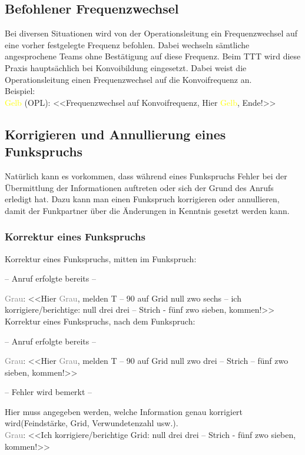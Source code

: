 \subsection{Befohlener Frequenzwechsel}
Bei diversen Situationen wird von der Operationsleitung ein Frequenzwechsel auf eine vorher festgelegte Frequenz befohlen. Dabei wechseln sämtliche angesprochene Teams ohne Bestätigung auf diese Frequenz. Beim TTT wird diese Praxis hauptsächlich bei Konvoibildung eingesetzt. Dabei weist die Operationsleitung einen Frequenzwechsel auf die Konvoifrequenz an. \\
Beispiel: \\
\textcolor{yellow}{Gelb} (OPL): <<Frequenzwechsel auf Konvoifrequenz, Hier \textcolor{yellow}{Gelb}, Ende!>> \\

\subsection{Korrigieren und Annullierung eines Funkspruchs}
Natürlich kann es vorkommen, dass während eines Funkspruchs Fehler bei der Übermittlung der Informationen auftreten oder sich der Grund des Anrufs erledigt hat. Dazu kann man einen Funkspruch korrigieren oder annullieren, damit der Funkpartner über die Änderungen in Kenntnis gesetzt werden kann. \\

\subsubsection{Korrektur eines Funkspruchs}
Korrektur eines Funkspruchs, mitten im Funkspruch: \\
\begin{center}
– Anruf erfolgte bereits –
\end{center}
\textcolor{gray}{Grau}: <<Hier \textcolor{gray}{Grau}, melden T – 90 auf Grid null zwo sechs – ich korrigiere/berichtige: null drei drei – Strich - fünf zwo sieben, kommen!>> \\
Korrektur eines Funkspruchs, nach dem Funkspruch: \\
\begin{center}
– Anruf erfolgte bereits –
\end{center}
\textcolor{gray}{Grau}: <<Hier \textcolor{gray}{Grau}, melden T – 90 auf Grid null zwo drei – Strich – fünf zwo sieben, kommen!>> \\
\begin{center}
– Fehler wird bemerkt – \\
\end{center}
Hier muss angegeben werden, welche Information genau korrigiert wird(Feindstärke, Grid, Verwundetenzahl usw.). \\
\textcolor{gray}{Grau}: <<Ich korrigiere/berichtige Grid: null drei drei – Strich - fünf zwo sieben, kommen!>> \\

